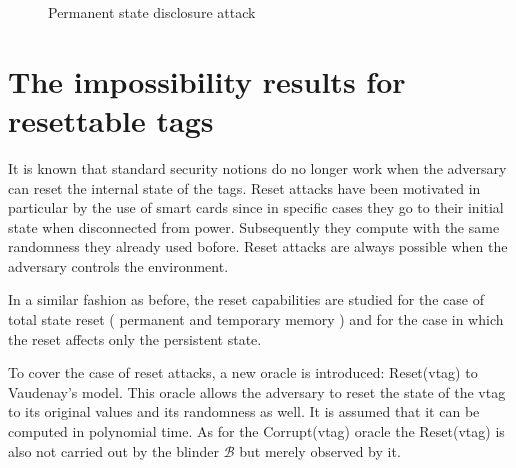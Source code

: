     \begin{figure}[H]
        
    \hspace*{2cm}
    \caption{Permanent state disclosure attack}
    \end{figure}

\section{The impossibility results for resettable tags}

    It is known that standard security notions do no longer work when the adversary can reset the internal state of the tags. Reset attacks have
    been motivated in particular by the use of smart cards since in specific cases they go to their initial state when disconnected from power. Subsequently
    they compute with the same randomness they already used bofore. Reset attacks are always possible when the adversary controls the environment.

    In a similar fashion as before, the reset capabilities are studied for the case of total state reset ( permanent and temporary memory ) and for the case in which
    the reset affects only the persistent state.

    To cover the case of reset attacks, a new oracle is introduced: Reset(vtag) to Vaudenay's model. This oracle allows the adversary to reset the state of the vtag
    to its original values and its randomness as well. It is assumed that it can be computed in polynomial time. As for the Corrupt(vtag) oracle the Reset(vtag) is also not carried out
    by the blinder $\mathcal{B}$ but merely observed by it.

